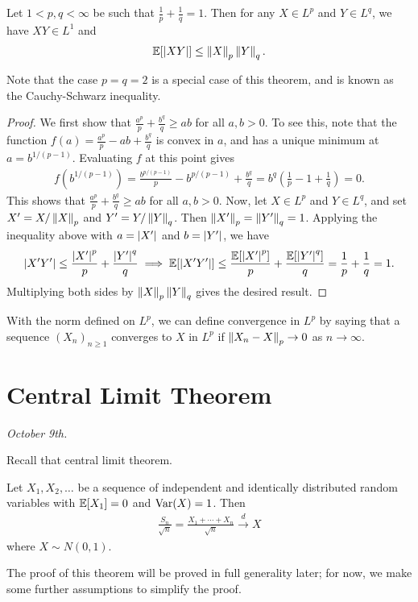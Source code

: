 \begin{theorem}
    Let $1 < p,q < \infty$ be such that $\frac{1}{p}+\frac{1}{q} = 1$. Then for any $X \in L^{p}$ and $Y \in L^{q}$, we have $XY \in L^{1}$ and
    \begin{align}
        \mathbb{E}[\left| XY \right|] \leq \left\lVert X\right\rVert_{p}\left\lVert Y\right\rVert_{q}.
    \end{align}
\end{theorem}
Note that the case $p = q = 2$ is a special case of this theorem, and is known as the Cauchy-Schwarz inequality.
\begin{proof}
    We first show that $\frac{a^{p}}{p} + \frac{b^{q}}{q} \geq ab$ for all $a,b > 0$. To see this, note that the function $f(a) = \frac{a^{p}}{p} - ab + \frac{b^{q}}{q}$ is convex in $a$, and has a unique minimum at $a = b^{1/(p-1)}$. Evaluating $f$ at this point gives
    \begin{align}
        f(b^{1/(p-1)}) = \frac{b^{p/(p-1)}}{p} - b^{p/(p-1)} + \frac{b^{q}}{q} = b^{q}\left(\frac{1}{p}-1+\frac{1}{q}\right) = 0.
    \end{align}
    This shows that $\frac{a^{p}}{p} + \frac{b^{q}}{q} \geq ab$ for all $a,b > 0$. Now, let $X \in L^{p}$ and $Y \in L^{q}$, and set $X' = X/\left\lVert X\right\rVert_{p}$ and $Y' = Y/\left\lVert Y\right\rVert_{q}$. Then $\left\lVert X'\right\rVert_{p} = \left\lVert Y'\right\rVert_{q} = 1$. Applying the inequality above with $a = \left| X' \right|$ and $b = \left| Y' \right|$, we have
    \begin{align}
        \left| X'Y' \right| \leq \frac{\left| X' \right|^{p}}{p} + \frac{\left| Y' \right|^{q}}{q} \implies \mathbb{E}[\left| X'Y' \right|] \leq \frac{\mathbb{E}[\left| X' \right|^{p}]}{p} + \frac{\mathbb{E}[\left| Y' \right|^{q}]}{q} = \frac{1}{p} + \frac{1}{q} = 1.
    \end{align}
    Multiplying both sides by $\left\lVert X\right\rVert_{p}\left\lVert Y\right\rVert_{q}$ gives the desired result.
\end{proof}
With the norm defined on $L^{p}$, we can define convergence in $L^{p}$ by saying that a sequence $(X_{n})_{n \geq 1}$ converges to $X$ in $L^{p}$ if $\left\lVert X_{n}-X\right\rVert_{p} \to 0$ as $n \to \infty$.


\section{Central Limit Theorem}
\textit{October 9th.}

Recall that central limit theorem.
\begin{theorem}
    Let $X_{1},X_{2},\ldots$ be a sequence of independent and identically distributed random variables with $\mathbb{E}[X_{1}] = 0$ and $\operatorname{Var}(X) = 1$. Then
    \begin{align}
        \frac{S_{n}}{\sqrt{n}} = \frac{X_{1} + \cdots + X_{n}}{\sqrt{n}} \xrightarrow{d} X
    \end{align}
    where $X \sim N(0,1)$.
\end{theorem}
The proof of this theorem will be proved in full generality later; for now, we make some further assumptions to simplify the proof.

